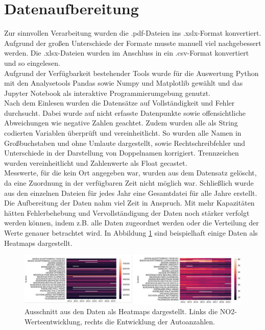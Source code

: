 \documentclass[11pt,a4paper,oneside,german]{article}
\begin{document}
	\section{Datenaufbereitung}
	
	Zur sinnvollen Verarbeitung wurden die .pdf-Dateien ins .xslx-Format konvertiert. Aufgrund der großen Unterschiede der Formate musste manuell viel nachgebessert werden. Die .xlsx-Dateien wurden im Anschluss in ein .csv-Format konvertiert und so eingelesen.\\
	Aufgrund der Verfügbarkeit bestehender Tools wurde für die Auswertung Python mit den Analysetools Pandas sowie Numpy und Matplotlib gewählt und das Jupyter Notebook als interaktive Programmierumgebung genutzt.\\
	Nach dem Einlesen wurden die Datensätze auf Vollständigkeit und Fehler durchsucht. Dabei wurde auf nicht erfasste Datenpunkte sowie offensichtliche Abweichungen wie negative Zahlen geachtet. Zudem wurden alle als String codierten Variablen überprüft und vereinheitlicht. So wurden alle Namen in Großbuchstaben und ohne Umlaute dargestellt, sowie Rechtschreibfehler und Unterschiede in der Darstellung von Doppelnamen korrigiert. Trennzeichen wurden vereinheitlicht und Zahlenwerte als Float gecastet. \\
	Messwerte, für die kein Ort angegeben war, wurden aus dem Datensatz gelöscht, da eine Zuordnung in der verfügbaren Zeit nicht möglich war. Schließlich wurde aus den einzelnen Dateien für jedes Jahr eine Gesamtdatei für alle Jahre erstellt. \\
	Die Aufbereitung der Daten nahm viel Zeit in Anspruch. Mit mehr Kapazitäten hätten Fehlerbehebung und Vervollständigung der Daten noch stärker verfolgt werden können, indem z.B. alle Daten zugeordnet werden oder die Verteilung der Werte genauer betrachtet wird. In Abbildung \ref{fig:Heatmaps} sind beispielhaft einige Daten als Heatmaps dargestellt.
	
	\begin{figure}[h!]
		\centering
		\includegraphics[width=12cm]{Heatmaps.png}
		\caption{Ausschnitt aus den Daten als Heatmaps dargestellt. Links die NO2-Werteentwicklung, rechts die Entwicklung der Autoanzahlen.}
		\label{fig:Heatmaps}
	\end{figure}
	
\end{document}
